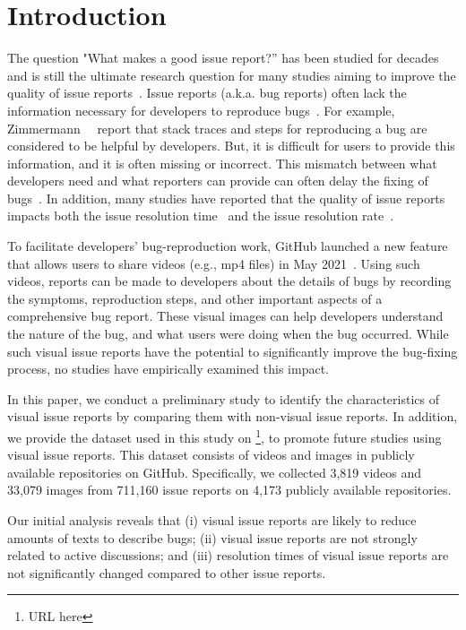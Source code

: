 \section{Introduction}
\label{sec:intro}
The question "What makes a good issue report?'' has been studied for decades and is still the ultimate research question for many studies aiming to improve the quality of issue reports~\citep{DBLP:conf/icse/HerzigJZ13}\citep{zimmermann2010TSE}\citep{DBLP:conf/eclipse/BettenburgJSWPZ07}. Issue reports (a.k.a. bug reports) often lack the information necessary for developers to reproduce bugs~\citep{DBLP:conf/msr/JoorabchiMM14}\citep{DearGitHub}. 
For example, Zimmermann~\et~\citep{zimmermann2010TSE} report that stack traces and steps for reproducing a bug are considered to be helpful by developers. But, it is difficult for users to provide this information, and it is often missing or incorrect. 
This mismatch between what developers need and what reporters can provide can often delay the fixing of bugs~\citep{DBLP:conf/msr/JoorabchiMM14}. In addition, many studies have reported that the quality of issue reports impacts both the issue resolution time~\citep{DBLP:conf/cscw/BreuPSZ10}\citep{DBLP:conf/icse/GuoZNM10} and the issue resolution rate~\citep{DBLP:conf/compsac/ZouXZCL15}\citep{DBLP:conf/icse/ZimmermannNGM12}. 

To facilitate developers' bug-reproduction work, GitHub launched a new feature that allows users to share videos (e.g., mp4 files) in May 2021~\citep{github-video-blog}. Using such videos, reports can be made to developers about the details of bugs by recording the symptoms, reproduction steps, and other important aspects of a comprehensive bug report. These visual images can help developers understand the nature of the bug, and what users were doing when the bug occurred. While such visual issue reports have the potential to significantly improve the bug-fixing process, no studies have empirically examined this impact. 

In this paper, we conduct a preliminary study to identify the characteristics of visual issue reports by comparing them with non-visual issue reports.  In addition, we provide the dataset used in this study on \footnote{URL here}, to promote future studies using visual issue reports. This dataset consists of videos and images in publicly available repositories on GitHub. Specifically, we collected 3,819 videos and 33,079 images from 711,160 issue reports on 4,173 publicly available repositories.


Our initial analysis reveals that (i) visual issue reports are likely to reduce amounts of texts to describe bugs; (ii) visual issue reports are not strongly related to active discussions; and (iii) resolution times of visual issue reports are not significantly changed compared to other issue reports. 
